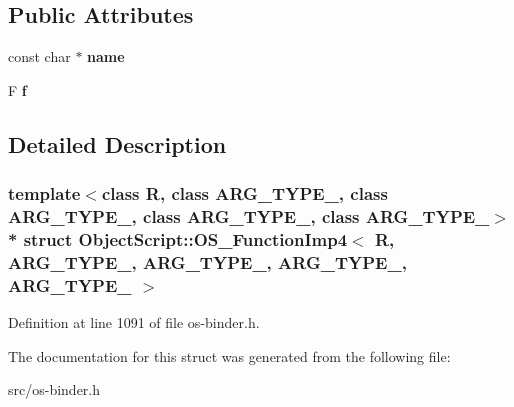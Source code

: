 \subsection*{Public Attributes}
\begin{DoxyCompactItemize}
\item 
const char $\ast$ {\bfseries name}\hypertarget{struct_object_script_1_1_o_s___function_imp4_a9fb4b38bcd023adaa80089d97d6d986d}{}\label{struct_object_script_1_1_o_s___function_imp4_a9fb4b38bcd023adaa80089d97d6d986d}

\item 
F {\bfseries f}\hypertarget{struct_object_script_1_1_o_s___function_imp4_ab1523e4b94c67dd5e034e37f4055d6d6}{}\label{struct_object_script_1_1_o_s___function_imp4_ab1523e4b94c67dd5e034e37f4055d6d6}

\end{DoxyCompactItemize}


\subsection{Detailed Description}
\subsubsection*{template$<$class R, class A\+R\+G\+\_\+\+T\+Y\+P\+E\+\_, class A\+R\+G\+\_\+\+T\+Y\+P\+E\+\_, class A\+R\+G\+\_\+\+T\+Y\+P\+E\+\_, class A\+R\+G\+\_\+\+T\+Y\+P\+E\+\_$>$\\*
struct Object\+Script\+::\+O\+S\+\_\+\+Function\+Imp4$<$ R, A\+R\+G\+\_\+\+T\+Y\+P\+E\+\_, A\+R\+G\+\_\+\+T\+Y\+P\+E\+\_, A\+R\+G\+\_\+\+T\+Y\+P\+E\+\_, A\+R\+G\+\_\+\+T\+Y\+P\+E\+\_ $>$}



Definition at line 1091 of file os-\/binder.\+h.



The documentation for this struct was generated from the following file\+:\begin{DoxyCompactItemize}
\item 
src/os-\/binder.\+h\end{DoxyCompactItemize}
